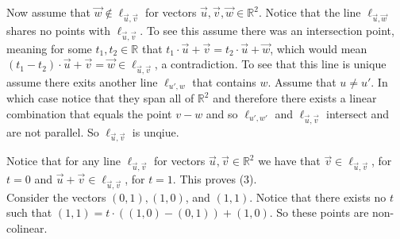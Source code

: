 \documentclass[12pt]{amsart}
\theoremstyle{definition}
\newcommand{\R}{\mathbb{R}}
\begin{document}
\begin{itemize}
Now assume that $\vec{w}\not\in \ell_{\vec{u},\vec{v}}$ for vectors $\vec{u},\vec{v},\vec{w}\in \R^2$. Notice that the line $\ell_{\vec{u}, \vec{w}}$ shares no points with $\ell_{\vec{u},\vec{v}}$. To see this assume there was an intersection point, meaning for some $t_1,t_2\in \R$ that $t_1\cdot \vec{u}+\vec{v}=t_2\cdot\vec{u}+\vec{w}$, which would mean $(t_1-t_2)\cdot \vec{u}+\vec{v}=\vec{w}\in\ell_{\vec{u},\vec{v}}$, a contradiction. To see that this line is unique assume there exits another line $\ell_{u',w}$ that contains $w$. Assume that $u\neq u'$. In which case notice that they span all of $\R^2$ and therefore there exists a linear combination that equals the point $v-w$ and so $\ell_{u',w'}$ and $\ell_{\vec{u},\vec{v}}$ intersect and are not parallel. So $\ell_{\vec{u},\vec{v}}$ is unqiue.

Notice that for any line $\ell_{\vec{u},\vec{v}}$ for vectors $\vec{u},\vec{v}\in \R^2$ we have that $\vec{v}\in \ell_{\vec{u},\vec{v}}$, for $t=0$ and $\vec{u}+\vec{v}\in\ell_{\vec{u},\vec{v}}$, for $t=1$. This proves (3).\\

Consider the vectors $(0,1), (1,0)$, and $(1,1)$. Notice that there exists no $t$ such that $(1,1)=t\cdot ((1,0)-(0,1))+(1,0)$. So these points are non-colinear.\\



\end{itemize}
\end{document}
